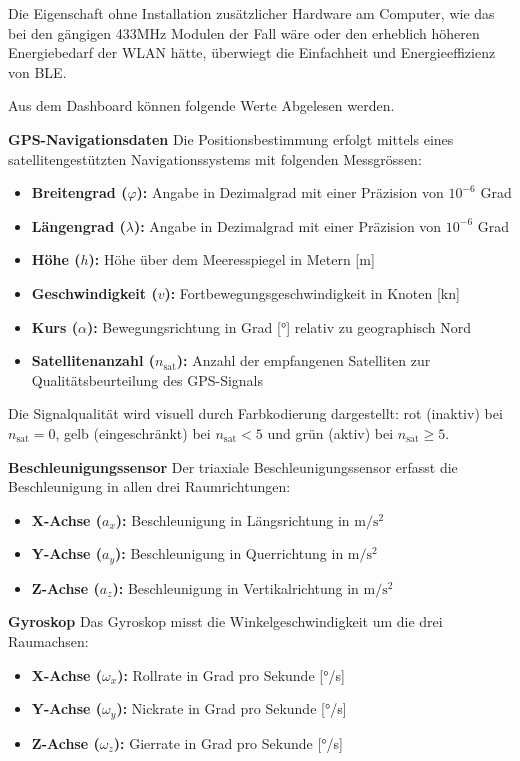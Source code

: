 Die Eigenschaft ohne Installation zusätzlicher Hardware am Computer, wie das bei den gängigen 433MHz Modulen der Fall wäre oder den erheblich höheren Energiebedarf der WLAN hätte, überwiegt die Einfachheit und Energieeffizienz von BLE. 

Aus dem Dashboard können folgende Werte Abgelesen werden.

\textbf{GPS-Navigationsdaten}
Die Positionsbestimmung erfolgt mittels eines satellitengestützten Navigationssystems mit folgenden Messgrössen:
\begin{itemize}
    \item \textbf{Breitengrad ($\varphi$):} Angabe in Dezimalgrad mit einer Präzision von $10^{-6}$ Grad
    \item \textbf{Längengrad ($\lambda$):} Angabe in Dezimalgrad mit einer Präzision von $10^{-6}$ Grad
    \item \textbf{Höhe ($h$):} Höhe über dem Meeresspiegel in Metern [m]
    \item \textbf{Geschwindigkeit ($v$):} Fortbewegungsgeschwindigkeit in Knoten [kn]
    \item \textbf{Kurs ($\alpha$):} Bewegungsrichtung in Grad [°] relativ zu geographisch Nord
    \item \textbf{Satellitenanzahl ($n_{\text{sat}}$):} Anzahl der empfangenen Satelliten zur Qualitätsbeurteilung des GPS-Signals
\end{itemize}

Die Signalqualität wird visuell durch Farbkodierung dargestellt: rot (inaktiv) bei $n_{\text{sat}} = 0$, gelb (eingeschränkt) bei $n_{\text{sat}} < 5$ und grün (aktiv) bei $n_{\text{sat}} \geq 5$.

\textbf{Beschleunigungssensor}
Der triaxiale Beschleunigungssensor erfasst die Beschleunigung in allen drei Raumrichtungen:
\begin{itemize}
    \item \textbf{X-Achse ($a_x$):} Beschleunigung in Längsrichtung in $\text{m}/\text{s}^2$
    \item \textbf{Y-Achse ($a_y$):} Beschleunigung in Querrichtung in $\text{m}/\text{s}^2$
    \item \textbf{Z-Achse ($a_z$):} Beschleunigung in Vertikalrichtung in $\text{m}/\text{s}^2$
\end{itemize}

\textbf{Gyroskop}
Das Gyroskop misst die Winkelgeschwindigkeit um die drei Raumachsen:
\begin{itemize}
    \item \textbf{X-Achse ($\omega_x$):} Rollrate in Grad pro Sekunde [°/s]
    \item \textbf{Y-Achse ($\omega_y$):} Nickrate in Grad pro Sekunde [°/s]
    \item \textbf{Z-Achse ($\omega_z$):} Gierrate in Grad pro Sekunde [°/s]
\end{itemize}

